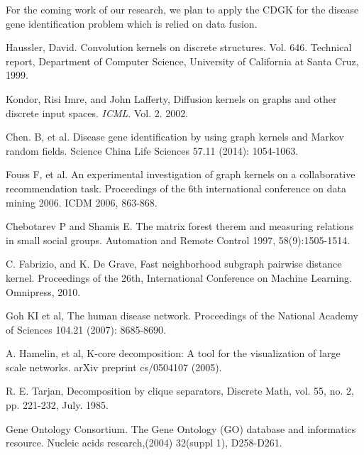 \documentclass{esannV2}
\begin{document}
For the coming work of our research, we plan to apply the CDGK for the disease gene identification problem which is relied on data fusion.

\begin{footnotesize}

\begin{thebibliography}{99}

 Haussler, David. Convolution kernels on discrete structures. Vol. 646. Technical report, Department of Computer Science, University of California at Santa Cruz, 1999.

 Kondor, Risi Imre, and John Lafferty, Diffusion kernels on graphs and other discrete input spaces. \emph{ICML}. Vol. 2. 2002.

 Chen. B, et al. Disease gene identification by using graph kernels and Markov random fields. Science China Life Sciences 57.11 (2014): 1054-1063.

 Fouss F, et al. An experimental investigation of graph kernels on a collaborative recommendation task. Proceedings of the 6th international conference on data mining 2006. ICDM 2006, 863-868.

 Chebotarev P and Shamis E. The matrix forest therem and measuring relations in small social groups. Automation and Remote Control 1997, 58(9):1505-1514.

 C. Fabrizio, and K. De Grave, Fast neighborhood subgraph pairwise distance kernel. Proceedings of the 26th, International Conference on Machine Learning. Omnipress, 2010.

 Goh KI et al, The human disease network. Proceedings of the National Academy of Sciences 104.21 (2007): 8685-8690.

 A. Hamelin, et al, K-core decomposition: A tool for the visualization of large scale networks. arXiv preprint cs/0504107 (2005).

 R. E. Tarjan, Decomposition by clique separators, Discrete Math, vol. 55, no. 2, pp. 221-232, July. 1985.

 Gene Ontology Consortium. The Gene Ontology (GO) database and informatics resource.
Nucleic acids research,(2004) 32(suppl 1), D258-D261.

\end{thebibliography}


%
%

\end{footnotesize}

\end{document}

